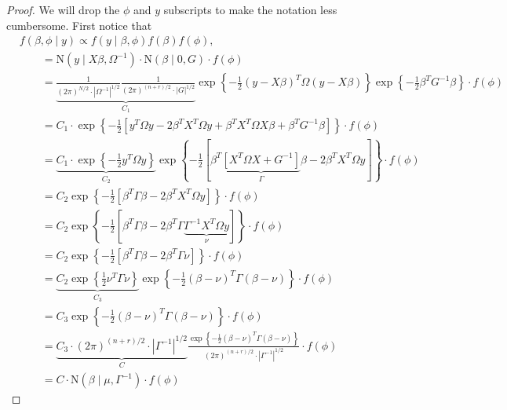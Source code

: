 \documentclass[10pt]{article}
\begin{document}
\begin{proof}
We will drop the $\phi$ and $y$ subscripts to make the notation less cumbersome. First notice that
%
\begin{align}
&f(\beta, \phi \mid y) \propto f(y \mid \beta, \phi) f(\beta) f(\phi), \nonumber \\
&\qquad= \text{N}(y \mid X \beta, \Omega^{-1}) \cdot \text{N}(\beta \mid 0, G) \cdot f(\phi) \nonumber \\
%
&\qquad= \underbrace{\frac{1}{ (2\pi)^{N/2} \cdot |\Omega^{-1}|^{1/2}}
\frac{1}{ (2\pi)^{(n+r)/2} \cdot |G|^{1/2}}}_{C_1}
\exp\left\{ -\frac{1}{2} (y - X \beta)^T \Omega (y - X \beta) \right\}
\exp\left\{ -\frac{1}{2} \beta^T G^{-1} \beta \right\}
\cdot f(\phi) \nonumber \\
%
&\qquad= C_1 \cdot
\exp\left\{ -\frac{1}{2} \left[ y^T \Omega y - 2 \beta^T X^T \Omega y + \beta^T X^T \Omega X \beta + \beta^T G^{-1} \beta\right] \right\}
\cdot f(\phi) \nonumber \\
%
&\qquad= \underbrace{C_1 \cdot \exp\left\{ -\frac{1}{2} y^T \Omega y \right\}}_{C_2}
\exp\left\{ -\frac{1}{2} \left[ \beta^T \underbrace{[X^T \Omega X + G^{-1}]}_{\Gamma} \beta - 2 \beta^T X^T \Omega y \right] \right\}
\cdot f(\phi) \nonumber \\
%
&\qquad= C_2
\exp\left\{ -\frac{1}{2} \left[ \beta^T \Gamma \beta - 2 \beta^T X^T \Omega y \right] \right\}
\cdot f(\phi) \nonumber \\
%
&\qquad= C_2
\exp\left\{ -\frac{1}{2} \left[ \beta^T \Gamma \beta - 2 \beta^T \Gamma \underbrace{\Gamma^{-1} X^T \Omega y}_{\nu} \right] \right\}
\cdot f(\phi) \nonumber \\
%
&\qquad= C_2
\exp\left\{ -\frac{1}{2} \left[ \beta^T \Gamma \beta - 2 \beta^T \Gamma \nu \right] \right\}
\cdot f(\phi) \nonumber \\
%
&\qquad= \underbrace{C_2 \exp\left\{ \frac{1}{2} \nu^T \Gamma \nu \right\}}_{C_3}
\exp\left\{ -\frac{1}{2} (\beta - \nu)^T \Gamma (\beta - \nu) \right\}
\cdot f(\phi) \nonumber \\
%
&\qquad= C_3
\exp\left\{ -\frac{1}{2} (\beta - \nu)^T \Gamma (\beta - \nu) \right\}
\cdot f(\phi) \nonumber \\
%
&\qquad= \underbrace{C_3 \cdot (2\pi)^{(n+r)/2} \cdot |\Gamma^{-1}|^{1/2}}_{C}
\frac{ \exp\left\{ -\frac{1}{2} (\beta - \nu)^T \Gamma (\beta - \nu) \right\} }{ (2\pi)^{(n+r)/2} \cdot |\Gamma^{-1}|^{1/2} }
\cdot f(\phi) \nonumber \\
%
&\qquad= C \cdot
\text{N}(\beta \mid \mu, \Gamma^{-1})
\cdot f(\phi)
\label{eqn:factoring}

\end{align}
\end{proof}
\end{document}
